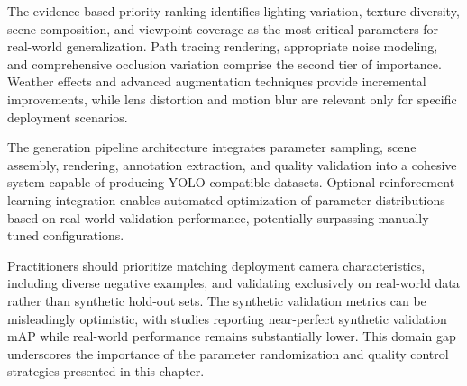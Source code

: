 The evidence-based priority ranking identifies lighting variation, texture diversity, scene composition, and viewpoint coverage as the most critical parameters for real-world generalization. Path tracing rendering, appropriate noise modeling, and comprehensive occlusion variation comprise the second tier of importance. Weather effects and advanced augmentation techniques provide incremental improvements, while lens distortion and motion blur are relevant only for specific deployment scenarios.

The generation pipeline architecture integrates parameter sampling, scene assembly, rendering, annotation extraction, and quality validation into a cohesive system capable of producing YOLO-compatible datasets. Optional reinforcement learning integration enables automated optimization of parameter distributions based on real-world validation performance, potentially surpassing manually tuned configurations.

Practitioners should prioritize matching deployment camera characteristics, including diverse negative examples, and validating exclusively on real-world data rather than synthetic hold-out sets. The synthetic validation metrics can be misleadingly optimistic, with studies reporting near-perfect synthetic validation mAP while real-world performance remains substantially lower. This domain gap underscores the importance of the parameter randomization and quality control strategies presented in this chapter.
